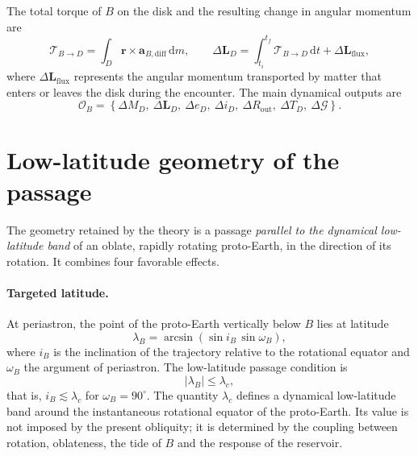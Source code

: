 \documentclass[11pt,a4paper,openany]{report}
\newcommand{\dd}{\mathrm{d}}
\begin{document}
The total torque of $B$ on the disk and the resulting change in angular momentum are
\begin{equation}
\boldsymbol{\mathcal{T}}_{B\to D}=\int_D\mathbf{r}\times\mathbf{a}_{B,\mathrm{diff}}\,\dd m,
\qquad
\Delta\mathbf{L}_D=\int_{t_i}^{t_f}\boldsymbol{\mathcal{T}}_{B\to D}\,\dd t+\Delta\mathbf{L}_{\mathrm{flux}},
\label{eq:couple}
\end{equation}
where $\Delta\mathbf{L}_{\mathrm{flux}}$ represents the angular momentum transported by matter that
enters or leaves the disk during the encounter. The main dynamical outputs are
\begin{equation}
\mathcal{O}_B=\left\{\Delta M_D,\ \Delta\mathbf{L}_D,\ \Delta e_D,\ \Delta i_D,\
\Delta R_{\mathrm{out}},\ \Delta T_D,\ \Delta\mathcal{G}\right\}.
\label{eq:OB}
\end{equation}

\section{Low-latitude geometry of the passage}
\label{sec:low-latitude}

The geometry retained by the theory is a passage \emph{parallel to the dynamical low-latitude
band} of an oblate, rapidly rotating proto-Earth, in the direction of its rotation. It combines four
favorable effects.

\paragraph{Targeted latitude.}
At periastron, the point of the proto-Earth vertically below $B$ lies at latitude
\begin{equation}
\lambda_B=\arcsin\left(\sin i_B\,\sin\omega_B\right),
\label{eq:lambdaB}
\end{equation}
where $i_B$ is the inclination of the trajectory relative to the rotational equator and $\omega_B$
the argument of periastron. The low-latitude passage condition is
\begin{equation}
|\lambda_B|\le\lambda_c,
\label{eq:low-latitude}
\end{equation}
that is, $i_B\lesssim\lambda_c$ for $\omega_B=90^\circ$. The quantity $\lambda_c$ defines a
dynamical low-latitude band around the instantaneous rotational equator of the proto-Earth. Its
value is not imposed by the present obliquity; it is determined by the coupling between rotation,
oblateness, the tide of $B$ and the response of the reservoir.
\end{document}
